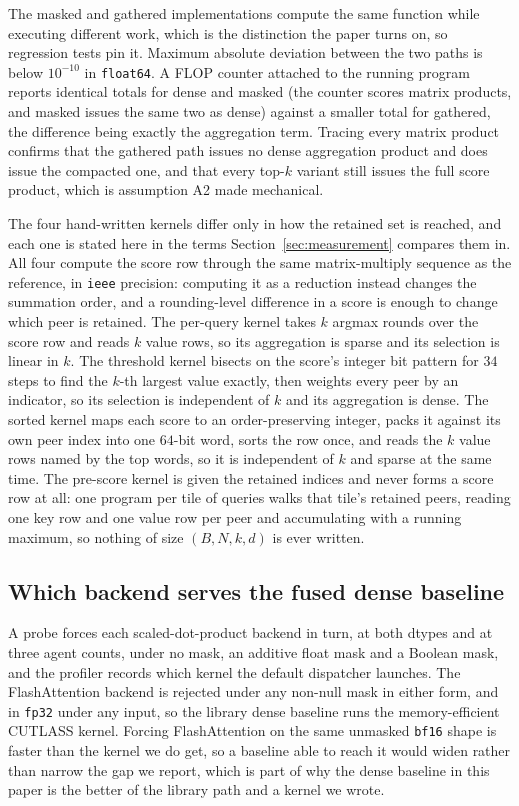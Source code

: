 The masked and gathered implementations compute the same function while
executing different work, which is the distinction the paper turns on, so
regression tests pin it. Maximum absolute deviation
between the two paths is below $10^{-10}$ in \texttt{float64}. A FLOP counter
attached to the running program reports identical totals for dense and masked
(the counter scores matrix products, and masked issues the same two as dense)
against a smaller total for gathered, the difference being exactly the
aggregation term. Tracing every matrix product confirms that the gathered path
issues no dense aggregation product and does issue the compacted one, and that
every top-$k$ variant still issues the full score product, which is assumption
A2 made mechanical.

The four hand-written kernels differ only in how the retained set is reached,
and each one is stated here in the terms Section~\ref{sec:measurement} compares
them in. All four compute the score row through the same matrix-multiply
sequence as the reference, in \texttt{ieee} precision: computing it as a
reduction instead changes the summation order, and a rounding-level difference
in a score is enough to change which peer is retained. The per-query kernel
takes $k$ argmax rounds over the score row and reads $k$ value rows, so its
aggregation is sparse and its selection is linear in $k$. The threshold kernel
bisects on the score's integer bit pattern for $34$ steps to find the $k$-th
largest value exactly, then weights every peer by an indicator, so its selection
is independent of $k$ and its aggregation is dense. The sorted kernel maps each
score to an order-preserving integer, packs it against its own peer index into
one $64$-bit word, sorts the row once, and reads the $k$ value rows named by the
top words, so it is independent of $k$ and sparse at the same time. The
pre-score kernel is given the retained indices and never forms a score row at
all: one program per tile of queries walks that tile's retained peers, reading
one key row and one value row per peer and accumulating with a running maximum,
so nothing of size $(B, N, k, d)$ is ever written.

\subsection{Which backend serves the fused dense baseline}

A probe forces each scaled-dot-product backend in turn, at both dtypes and at
three agent counts, under no mask, an additive float mask and a Boolean mask,
and the profiler records which kernel the default dispatcher launches. The
FlashAttention backend is rejected under any non-null mask in either form, and
in \texttt{fp32} under any input, so the library dense baseline runs the
memory-efficient CUTLASS kernel. Forcing FlashAttention on the same unmasked
\texttt{bf16} shape is faster than the kernel we do get, so a baseline able to
reach it would widen rather than narrow the gap we report, which is part of
why the dense baseline in this paper is the better of the library path and a
kernel we wrote.

